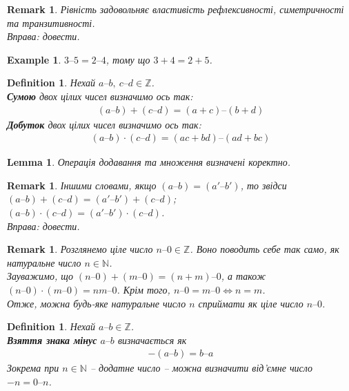 \documentclass[a4paper, 14pt]{extarticle}
\theoremstyle{theoremdd}
\theoremstyle{theoremdd}
\newtheorem{definition}[theorem]{Definition}
\theoremstyle{theoremdd}
\theoremstyle{theoremdd}
\theoremstyle{theoremdd}
\theoremstyle{theoremdd}
\newtheorem{example}[theorem]{Example}
\theoremstyle{theoremdd}
\theoremstyle{theoremdd}
\theoremstyle{theoremdd}
\theoremstyle{theoremdd}
\theoremstyle{theoremdd}
\theoremstyle{theoremdd}
\newtheorem{remark}[theorem]{Remark}
\theoremstyle{theoremdd}
\theoremstyle{theoremdd}
\newtheorem{lemma}[theorem]{Lemma}
\theoremstyle{theoremdd}
\theoremstyle{theoremdd}
\newcommand{\subtract}{\text{--}}
\begin{document}
\begin{remark}
Рівність задовольняє властивість рефлексивності, симетричності та транзитивності.\\
\textit{Вправа: довести.}
\end{remark}

\begin{example}
$3 \subtract 5 = 2 \subtract 4$, тому що $3 + 4 = 2 + 5$.
\end{example}

\begin{definition}
Нехай $a \subtract b,\ c \subtract d \in \mathbb{Z}$.\\
\textbf{Сумою} двох цілих чисел визначимо ось так:
\begin{align*}
(a \subtract b) + (c \subtract d) = (a+c)\subtract (b+d)
\end{align*}
\textbf{Добуток} двох цілих чисел визначимо ось так:
\begin{align*}
(a \subtract b) \cdot (c \subtract d) = (ac + bd)\subtract (ad+bc)
\end{align*}
\end{definition}

\begin{lemma}
Операція додавання та множення визначені коректно.
\end{lemma}

\begin{remark}
Іншими словами, якщо $(a \subtract b) = (a' \subtract b')$, то звідси\\
$(a \subtract b) + (c \subtract d) = (a' \subtract b') + (c \subtract d)$;\\
$(a \subtract b) \cdot (c \subtract d) = (a' \subtract b') \cdot (c \subtract d)$.\\
\textit{Вправа: довести.}
\end{remark}

\begin{remark}
Розглянемо ціле число $n\subtract 0 \in \mathbb{Z}$. Воно поводить себе так само, як натуральне число $n \in \mathbb{N}$.\\
Зауважимо, що $(n\subtract 0) + (m \subtract 0) = (n+m)\subtract 0$, а також $(n \subtract 0)  \cdot (m \subtract 0) = nm \subtract 0$. Крім того, $n \subtract 0 = m \subtract 0 \iff n = m$.\\
Отже, можна будь-яке натуральне число $n$ сприймати як ціле число $n \subtract 0$. 
\end{remark}

\begin{definition}
Нехай $a\subtract b \in \mathbb{Z}$.\\
\textbf{Взяття знака мінус} $a\subtract b$ визначається як
\begin{align*}
-(a \subtract b) = b\subtract a
\end{align*}
Зокрема при $n \in \mathbb{N}$ -- додатне число -- можна визначити від'ємне число $-n = 0 \subtract n$.
\end{definition}
\end{document}
